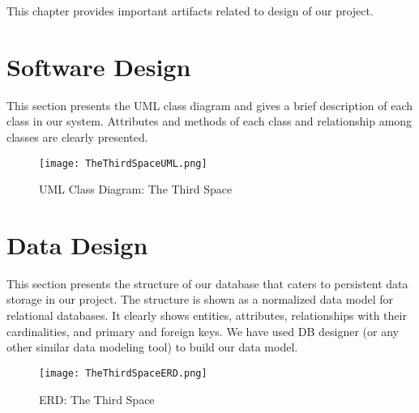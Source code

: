 This chapter provides important artifacts related to design of our project.

\section{Software Design}

This section presents the UML class diagram and gives a brief description of each class in our system. Attributes and methods of each class and relationship among classes are clearly presented.

\begin{figure}
\caption{UML Class Diagram: The Third Space}
\texttt{[image: TheThirdSpaceUML.png]} 
\end{figure}


\clearpage
\section{Data Design}

This section presents the structure of our database that caters to persistent data storage in our project. The structure is shown as a normalized data model for relational databases. It clearly shows entities, attributes, relationships with their cardinalities, and primary and foreign keys. We have used DB designer (or any other similar data modeling tool) to build our data model.

\begin{figure}[h]
  \caption{ERD: The Third Space}
  \texttt{[image: TheThirdSpaceERD.png]}
  \centering
\end{figure}